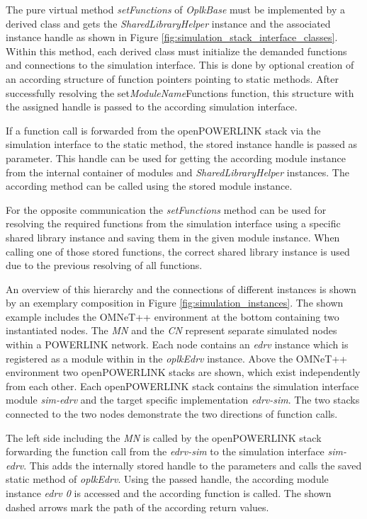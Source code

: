 The pure virtual method \emph{setFunctions} of \emph{OplkBase} must be implemented by a derived class and gets the \emph{SharedLibraryHelper} instance and the associated instance handle as shown in  Figure \ref{fig:simulation_stack_interface_classes}.
Within this method, each derived class must initialize the demanded functions and connections to the simulation interface.
This is done by optional creation of an according structure of function pointers pointing to static methods.
After successfully resolving the set\emph{ModuleName}Functions function, this structure with the assigned handle is passed to the according simulation interface.

If a function call is forwarded from the openPOWERLINK stack via the simulation interface to the static method, the stored instance handle is passed as parameter.
This handle can be used for getting the according module instance from the internal container of modules and \emph{SharedLibraryHelper} instances.
The according method can be called using the stored module instance.

For the opposite communication the \emph{setFunctions} method can be used for resolving the required functions from the simulation interface using a specific shared library instance and saving them in the given module instance.
When calling one of those stored functions, the correct shared library instance is used due to the previous resolving of all functions.

An overview of this hierarchy and the connections of different instances is shown by an exemplary composition in Figure \ref{fig:simulation_instances}.
The shown example includes the OMNeT++ environment at the bottom containing two instantiated nodes.
The \emph{MN} and the \emph{CN} represent separate simulated nodes within a POWERLINK network.
Each node contains an \emph{edrv} instance which is registered as a module within in the \emph{oplkEdrv} instance.
Above the OMNeT++ environment two openPOWERLINK stacks are shown, which exist independently from each other.
Each openPOWERLINK stack contains the simulation interface module \emph{sim-edrv} and the target specific implementation \emph{edrv-sim}.
The two stacks connected to the two nodes demonstrate the two directions of function calls.

The left side including the \emph{MN} is called by the openPOWERLINK stack forwarding the function call from the \emph{edrv-sim} to the simulation interface \emph{sim-edrv}.
This adds the internally stored handle to the parameters and calls the saved static method of \emph{oplkEdrv}.
Using the passed handle, the according module instance \emph{edrv 0} is accessed and the according function is called.
The shown dashed arrows mark the path of the according return values.

